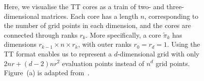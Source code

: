 \begin{figure}[ht!]
	\centering
\begin{subfigure}{\textwidth}
	
	\caption{}
\end{subfigure}
	\centering
\begin{subfigure}{\textwidth}
	\caption{}
\end{subfigure}
\caption[Visualisation of a tensor train]{Here, we visualise the TT cores as a train of two- and three-dimensional matrices. 
Each core has a length $n$, corresponding to the number of grid points in each dimension, and the cores are connected through ranks $r_k$. 
More specifically, a core $\tilde{\pi}_k$ has dimensions $r_{k-1} \times n \times r_k$, with outer ranks $r_0 = r_d = 1$.
Using the TT format enables us to represent a $d$-dimensional grid with only $2nr + (d-2)nr^2$ evaluation points instead of $n^d$ grid points.
Figure~(a) is adapted from~\cite{fox2021grid}.}
\label{fig:TTfig}
\end{figure}


